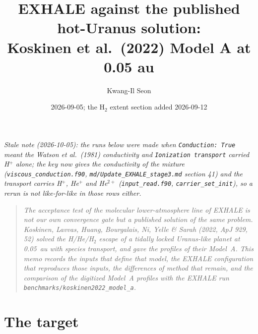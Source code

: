\documentclass[english,a4paper]{my_memo}
\begin{document}
\title{EXHALE against the published hot-Uranus solution:\\
       Koskinen et al.\ (2022) Model A at 0.05 au}
\author{Kwang-Il Seon}
\date{2026-09-05; the H$_2$ extent section added 2026-09-12}
\maketitle

\noindent\textit{Stale note (2026-10-05): the runs below were made when \texttt{Conduction: True} meant the Watson et al.\ (1981) conductivity and \texttt{Ionization transport} carried H$^+$ alone; the key now gives the conductivity of the mixture (\texttt{viscous\_conduction.f90}, \texttt{md/Update\_EXHALE\_stage3.md} section 41) and the transport carries H$^+$, He$^+$ and He$^{2+}$ (\texttt{input\_read.f90}, \texttt{carrier\_set\_init}), so a rerun is not like-for-like in those rows either.}

\begin{quote}\small\itshape
The acceptance test of the molecular lower-atmosphere line of EXHALE is not
our own convergence gate but a published solution of the same problem.
Koskinen, Lavvas, Huang, Bourgalais, Ni, Yelle \& Sarah (2022, ApJ 929, 52)
solved the H/He/H$_2$ escape of a tidally locked Uranus-like planet at 0.05~au
with species transport, and gave the profiles of their Model~A. This memo
records the inputs that define that model, the EXHALE configuration that
reproduces those inputs, the differences of method that remain, and the
comparison of the digitized Model~A profiles with the EXHALE run
\texttt{benchmarks/koskinen2022\_model\_a}.
\end{quote}

\section{The target}
\end{document}
